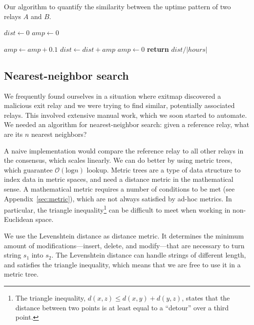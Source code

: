 \begin{algorithm}[t]
\caption{Our algorithm to quantify the similarity between the uptime pattern
of two relays $A$ and $B$.}
\label{alg:uptime}
\begin{algorithmic}[1]
    \State $dist \gets 0$
    \State $amp \gets 0$

                \State $amp \gets amp + 0.1$
            \EndIf
        \State $dist \gets dist + amp$
        \Else
            \State $amp \gets 0$
        \EndIf
    \EndFor
    \State \textbf{return} $dist / \lvert hours \rvert$
\EndFunction
\end{algorithmic}
\end{algorithm}

\subsection{Nearest-neighbor search}
\label{sec:nearest-neighbor}
We frequently found ourselves in a situation where exitmap discovered a
malicious exit relay and we were trying to find similar, potentially associated
relays.  This involved extensive manual work, which we soon started to
automate.  We needed an algorithm for nearest-neighbor search: given a
reference relay, what are its $n$ nearest neighbors?

A naive implementation would compare the reference relay to all other relays in
the consensus, which scales linearly.  We can do better by using metric trees,
which guarantee $\mathcal{O}(\textrm{log} n)$ lookup.  Metric trees are a type
of data structure to index data in metric spaces, and need a distance metric in
the mathematical sense.  A mathematical metric requires a number of conditions
to be met (see Appendix~\ref{sec:metric}), which are not always satisfied by
ad-hoc metrics.  In particular, the triangle inequality\footnote{The triangle
inequality, $d(x, z) \le d(x, y) + d(y, z)$, states that the distance between
two points is at least equal to a ``detour'' over a third point.} can be
difficult to meet when working in non-Euclidean space.

We use the Levenshtein distance as distance metric.  It determines the minimum
amount of modifications---insert, delete, and modify---that are necessary to
turn string $s_{1}$ into $s_{2}$.  The Levenshtein distance can handle strings
of different length, and satisfies the triangle inequality, which means that we
are free to use it in a metric tree.

